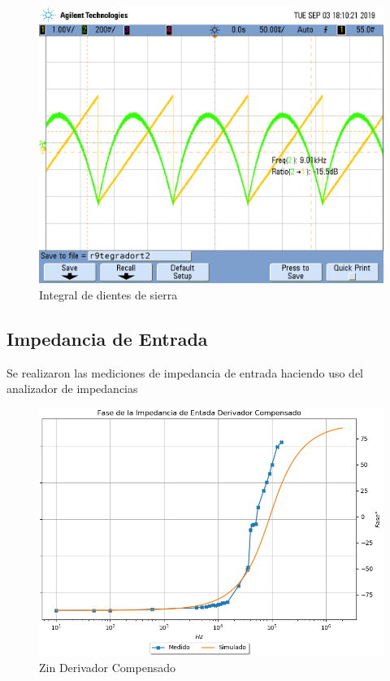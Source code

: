 \begin{figure}[H]
	\centering
	\includegraphics[width=\textwidth]{Ejercicio4/FOTOS-TP2-TC-EJ4/r9tegradort2} 
	\caption{Integral de dientes de sierra}
\end{figure}

\subsection{Impedancia de Entrada}
Se realizaron las mediciones de impedancia de entrada haciendo uso del analizador de impedancias

\begin{figure}[H]
	\centering
	\includegraphics[width=\textwidth]{Ejercicio4/SUPERPOSICION-ZIN-DERIVADOR-COMPENSADO-FASE} 
	\caption{Zin Derivador Compensado}
\end{figure}

